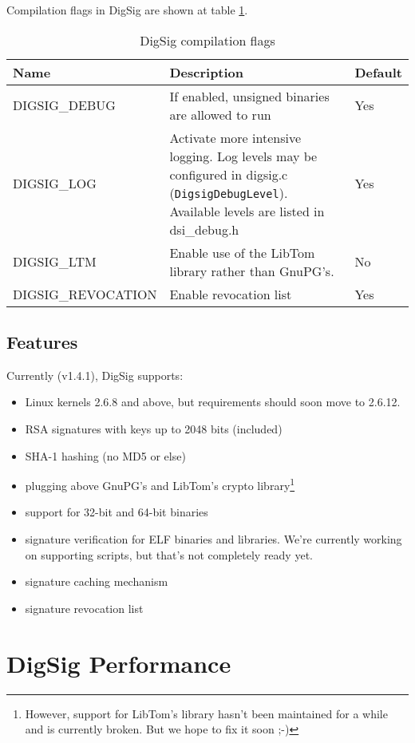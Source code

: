 \documentclass{article}
\begin{document}
Compilation flags in DigSig are shown at table \ref{tab:flags}.

\begin{table}[ht]
\begin{center}
\begin{tabular}{|p{4cm}|p{6cm}|p{2cm}|}
\hline
Name & Description & Default \\
\hline
DIGSIG\_DEBUG & If enabled, unsigned binaries are allowed to run & Yes\\
\hline
DIGSIG\_LOG & Activate more intensive logging. Log levels may be
configured in digsig.c (\texttt{DigsigDebugLevel}). Available levels
are listed in dsi\_debug.h & Yes \\
\hline
DIGSIG\_LTM & Enable use of the LibTom library \cite{ltm} rather than GnuPG's. & No\\
\hline
DIGSIG\_REVOCATION & Enable revocation list & Yes \\
\hline 
\end{tabular}
\caption{DigSig compilation flags}
\label{tab:flags}
\end{center}
\end{table}

\subsection{Features}

Currently (v1.4.1), DigSig supports:
\begin{itemize}
\item Linux kernels 2.6.8 and above, but requirements should soon move to 2.6.12.
\item RSA signatures with keys up to 2048 bits (included)
\item SHA-1 hashing (no MD5 or else)
\item plugging above GnuPG's and LibTom's crypto library\footnote{However, support for LibTom's library
hasn't been maintained for a while and is currently broken. But we hope to fix it soon ;-)}
\item support for 32-bit and 64-bit binaries
\item signature verification for ELF binaries and libraries. We're currently working on supporting scripts, 
but that's not completely ready yet.
\item signature caching mechanism
\item signature revocation list
\end{itemize}


\section{DigSig Performance} 
\end{document}
